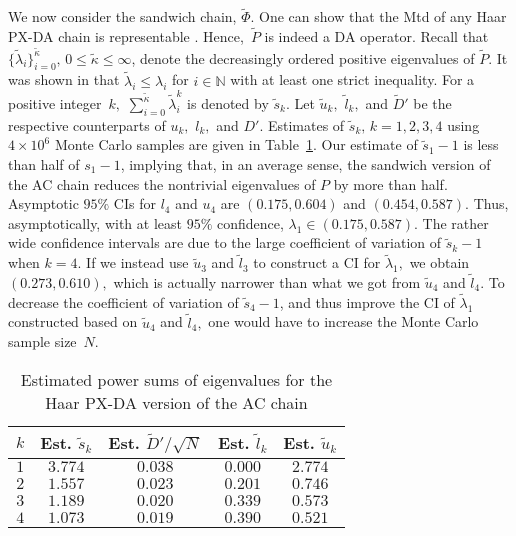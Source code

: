\documentclass[11pt]{article}
\begin{document}
	We now consider the sandwich chain, $\tilde{\Phi}$.  One can
        show that the Mtd of any Haar PX-DA chain is representable
        \citep{hobert2008theoretical}.  Hence,~$\tilde{P}$ is indeed a
        DA operator.  Recall that
        $\{\tilde{\lambda}_i\}_{i=0}^{\tilde{\kappa}}, \, 0 \leq
        \tilde{\kappa} \leq \infty$, denote the decreasingly ordered
        positive eigenvalues of $\tilde{P}$.  It was shown in
        \cite{khare2011spectral} that $\tilde{\lambda}_i \leq
        \lambda_i$ for $i \in \mathbb{N}$ with at least one strict
        inequality.  For a positive integer~$k,$ 
        $\sum_{i=0}^{\tilde{\kappa}}
        \tilde{\lambda}_i^k$ is denoted by $\tilde{s}_k$.  Let $\tilde{u}_k,$ $\tilde{l}_k,$ and
        $\tilde{D}'$ be the respective counterparts of $u_k,$ $l_k,$
        and $D'$.  Estimates of $\tilde{s}_k,\,k=1,2,3,4$ using
        $4\times 10^6$ Monte Carlo samples are given in
        Table~\ref{probit2}.  Our estimate of $\tilde{s}_1-1$ is less
        than half of $s_1-1$, implying that, in an average sense, the
        sandwich version of the AC chain reduces the nontrivial
        eigenvalues of $P$ by more than half.  Asymptotic $95\%$ CIs
        for $l_4$ and $u_4$ are $(0.175, 0.604)$ and $(0.454,0.587)$.
        Thus, asymptotically, with at least $95\%$ confidence,
        $\lambda_1 \in (0.175,0.587)$.  The rather wide confidence
        intervals are due to the large coefficient of variation of
        $\tilde{s}_k-1$ when $k=4.$ If we instead use $\tilde{u}_3$
        and $\tilde{l}_3$ to construct a CI for $\tilde{\lambda}_1,$
        we obtain $(0.273,0.610),$ which is actually narrower than
        what we got from $\tilde{u}_4$ and $\tilde{l}_4$.  To decrease
        the coefficient of variation of $\tilde{s}_4-1$, and thus
        improve the CI of $\tilde{\lambda}_1$ constructed based on
        $\tilde{u}_4$ and $\tilde{l}_4,$ one would have to increase
        the Monte Carlo sample size~$N$.

	\begin{table}[!h]
		\begin{center} \caption{Estimated power sums of eigenvalues for the Haar PX-DA version of the AC chain} \label{probit2}
             \medskip
			\begin{tabular}{ccccc} 
				$k$ & Est. $\tilde{s}_k$ & Est. $\tilde{D}'/\sqrt{N}$ & Est. $\tilde{l}_k$ & Est. $\tilde{u}_k$ \\ \hline
				$1$ & $3.774$ & $0.038$ & $0.000$ & $2.774$ \\
				$2$ & $1.557$ & $0.023$ & $0.201$ & $0.746$ \\
				$3$ & $1.189$ & $0.020$ & $0.339$ & $0.573$ \\
				$4$ & $1.073$ & $0.019$ & $0.390$ & $0.521$ \\
			\end{tabular}
		\end{center}
	\end{table}
	
\end{document}
